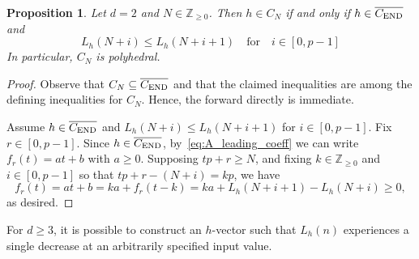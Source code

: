 \documentclass[12pt]{amsart}
\newtheorem{prop}[thm]{Proposition}
\theoremstyle{definition}
\numberwithin{equation}{section}
\renewcommand\>{\rangle}
\newcommand\<{\langle}
\newcommand\0{\mathbf{0}}
\newcommand\ZZ{\mathbb{Z}}
\newcommand{\CEND}{C_\textnormal{END}}
\begin{document}
\begin{prop}\label{prop:d2polyhedral}
	Let $d = 2$ and $N \in \ZZ_{\geq 0}$. Then $h \in C_N$ if and only if $h \in \overline{\CEND}$ and 
	\[L_h(N+i) \leq L_h(N+i+1) \quad \text{for} \quad i \in [0,p-1]\]
	In particular, $C_N$ is polyhedral.  
\end{prop}
\begin{proof}
	Observe that $C_N \subseteq \overline{\CEND}$ and that the claimed inequalities are among the defining inequalities for $C_N$.
	Hence, the forward directly is immediate.
	
	Assume $h \in \overline{\CEND}$ and $L_h(N+i) \leq L_h(N+i+1)$ for $i \in [0,p-1]$.  Fix $r \in [0,p-1]$.  Since $h \in \overline{\CEND}$, by~\eqref{eq:A_leading_coeff} we can write $f_r(t) = at + b$ with $a \ge 0$.  Supposing $tp + r \ge N$, and fixing $k \in \ZZ_{\ge 0}$ and $i \in [0,p-1]$ so that $tp + r - (N + i) = kp$, we have
	\[
		f_r(t) = at + b = ka + f_r(t-k) = ka + L_h(N+i+1) - L_h(N+i) \ge 0,
	\]
	as desired.
\end{proof}

For $d \geq 3$, it is possible to construct an $h$-vector such that $L_h(n)$ experiences a single decrease at an arbitrarily specified input value.  
\end{document}
